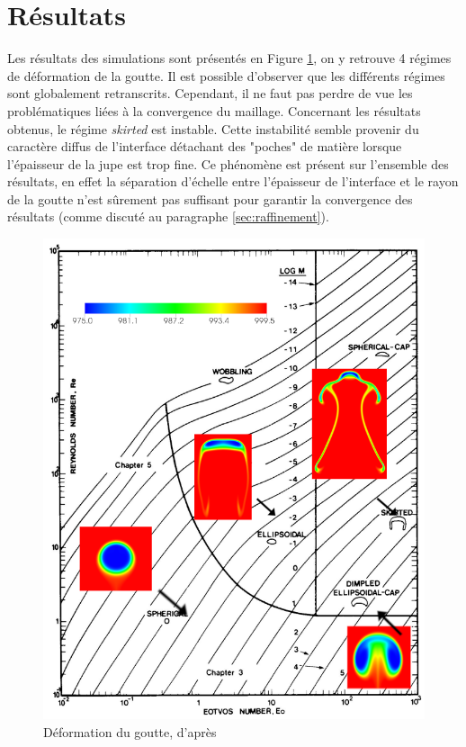 \section{Résultats}
Les résultats des simulations sont présentés en Figure \ref{fig:abaque}, on y retrouve 4 régimes de déformation de la goutte. Il est possible d'observer que les différents régimes sont globalement retranscrits. Cependant, il ne faut pas perdre de vue les problématiques liées à la convergence du maillage. Concernant les résultats obtenus, le régime \textit{skirted} est instable. Cette instabilité semble provenir du caractère diffus de l'interface détachant des "poches" de matière lorsque l'épaisseur de la jupe est trop fine. Ce phénomène est présent sur l'ensemble des résultats, en effet la séparation d'échelle entre l'épaisseur de l'interface et le rayon de la goutte n'est sûrement pas suffisant pour garantir la convergence des résultats (comme discuté au paragraphe \ref{sec:raffinement}).
\begin{figure}[H]
	\centering
	\includegraphics[width=1.0\linewidth]{figure/projet_abaque.png}
	\caption{Déformation du goutte, d'après \cite{clift_bubbles_2005}}
	\label{fig:abaque}
\end{figure}




 
